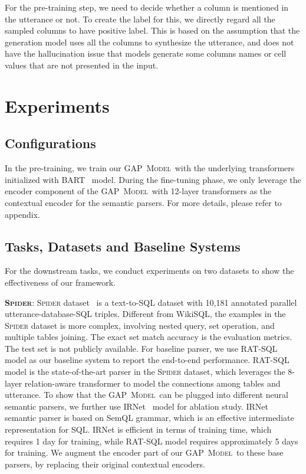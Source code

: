 \documentclass[letterpaper]{article} \usepackage{aaai21}  \usepackage{times}  \usepackage{helvet} \usepackage{courier}  \usepackage[hyphens]{url}  \usepackage{graphicx} \usepackage{booktabs}
\newcommand{\modelnamelm}{\textsc{GAP~Model}}
\begin{document}
For the pre-training step, we need to decide whether a column is mentioned in the utterance or not.
To create the label for this, we directly regard all the sampled columns to have positive label.
This is based on the assumption that the generation model uses all the columns to synthesize the utterance, and does not have the hallucination issue that models generate some columns names or cell values that are not presented in the input.

\section{Experiments}

\subsection{Configurations}
In the pre-training, we train our \modelnamelm~with the underlying transformers initialized with BART~\cite{lewis2019bart} model.
During the fine-tuning phase, we only leverage the encoder component of the \modelnamelm~with 12-layer transformers as the contextual encoder for the semantic parsers.
For more details, please refer to appendix.

\subsection{Tasks, Datasets and Baseline Systems}

For the downstream tasks, we conduct experiments on two datasets to show the effectiveness of our framework.

\smallskip \noindent \textbf{\textsc{Spider}}: \textsc{Spider} dataset~\cite{yu2018spider} is a text-to-SQL dataset with 10,181 annotated parallel utterance-database-SQL triples.
Different from WikiSQL, the examples in the \textsc{Spider} dataset is more complex, 
involving nested query, set operation, and multiple tables joining.
The exact set match accuracy is the evaluation metrics.
The test set is not publicly available.
For baseline parser, we use RAT-SQL~\cite{wang2019rat} model as our baseline system to report the end-to-end performance.
RAT-SQL model is the state-of-the-art parser in the \textsc{Spider} dataset, which leverages the 8-layer relation-aware transformer to model the connections among tables and utterance.
To show that the \modelnamelm~can be plugged into different neural semantic parsers, we further use IRNet~\cite{guo2019towards} model for ablation study.
IRNet semantic parser is based on SemQL grammar, which is an effective intermediate representation for SQL.
IRNet is efficient in terms of training time, which requires 1 day for training, while RAT-SQL model requires approximately 5 days for training.
We augment the encoder part of our \modelnamelm~to these base parsers, by replacing their original contextual encoders.
\end{document}
